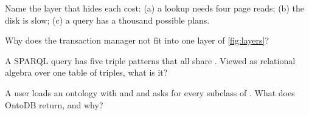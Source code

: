 \begin{checkyourself}
\item Name the layer that hides each cost: (a) a lookup needs four page reads; (b) the disk is slow; (c) a query has a thousand possible plans.
\item Why does the transaction manager not fit into one layer of \cref{fig:layers}?
\item A SPARQL query has five triple patterns that all share . Viewed as relational algebra over one table of triples, what is it?
\item A user loads an ontology with  and  and asks for every subclass of . What does OntoDB return, and why?
\end{checkyourself}
